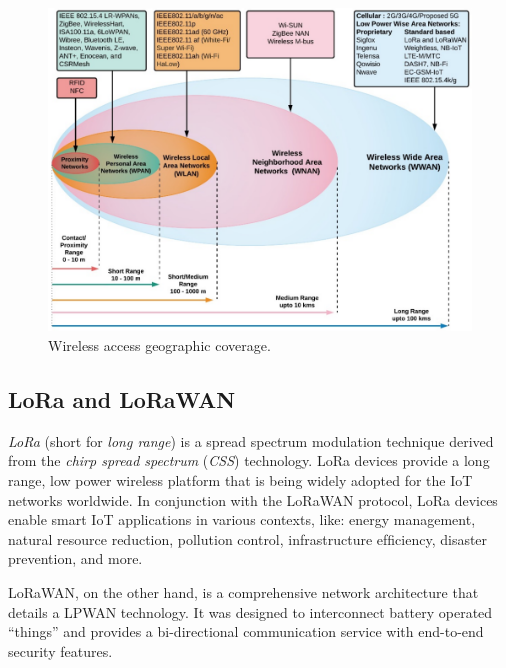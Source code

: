 		\begin{figure}
			\centering
			\includegraphics[width=\textheight,height=\textwidth,keepaspectratio,angle=90]{resources/img/chap3/iot_range}
			\caption[Wireless access geographic coverage.]{Wireless access geographic coverage. \cite{fi12030046}}
			\label{img:wireless_coverage}
		\end{figure}
	
		\subsection{LoRa and LoRaWAN}\label{subsec:lora_lorawan}
	
			\textit{LoRa} (short for \textit{long range}) is a spread spectrum modulation technique derived from the \textit{chirp spread spectrum} (\textit{CSS}) technology.
			LoRa devices provide a long range, low power wireless platform that is being widely adopted for the IoT networks worldwide.
			In conjunction with the LoRaWAN protocol, LoRa devices enable smart IoT applications in various contexts, like: energy management, natural resource reduction, pollution control, infrastructure efﬁciency, disaster prevention, and more. 
	
			LoRaWAN, on the other hand, is a comprehensive network architecture that details a LPWAN technology.
			It was designed to interconnect battery operated ``things'' and provides a bi-directional communication service with end-to-end security features.
	
